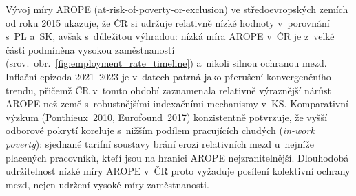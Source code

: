 Vývoj míry \ac{AROPE} (at-risk-of-poverty-or-exclusion) ve středoevropských zemích od roku 2015 ukazuje, že ČR si udržuje relativně nízké hodnoty v~porovnání s~PL a~SK, avšak s~důležitou výhradou: nízká míra \ac{AROPE} v~ČR je z~velké části podmíněna vysokou zaměstnaností (srov.~obr.~\ref{fig:employment_rate_timeline}) a~nikoli silnou ochranou mezd.
Inflační epizoda 2021--2023 je v~datech patrná jako přerušení konvergenčního trendu, přičemž ČR v~tomto období zaznamenala relativně výraznější nárůst \ac{AROPE} než země s~robust­nějšími indexačními mechanismy v~\ac{KS}.
Komparativní výzkum (Ponthieux~2010, Eurofound~2017) konzistentně potvrzuje, že vyšší odborové pokrytí koreluje s~nižším podílem pracujících chudých (\emph{in-work poverty}): sjednané tarifní soustavy brání erozi relativních mezd u~nejníže placených pracovníků, kteří jsou na hranici \ac{AROPE} nejzranitelnější.
Dlouhodobá udržitelnost nízké míry \ac{AROPE} v~ČR proto vyžaduje posílení kolektivní ochrany mezd, nejen udržení vysoké míry zaměstnanosti.



